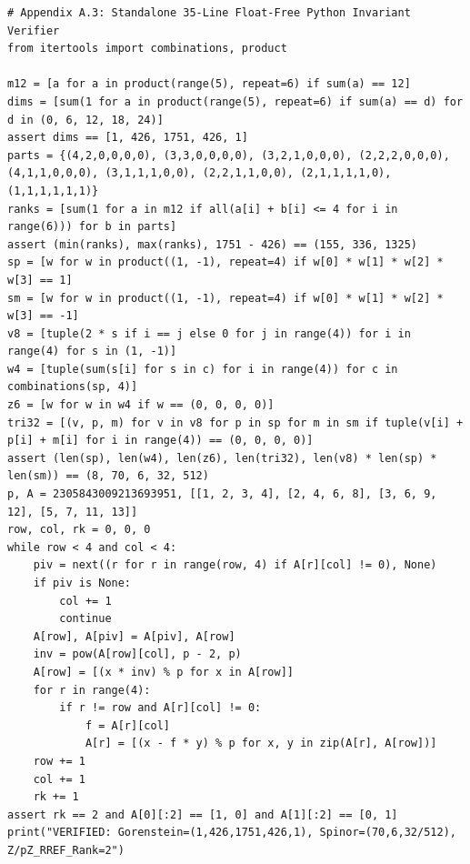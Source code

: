 \documentclass[11pt,a4paper]{article}
\theoremstyle{definition}
\theoremstyle{remark}
\begin{document}
\begin{lstlisting}[style=pycode]
# Appendix A.3: Standalone 35-Line Float-Free Python Invariant Verifier
from itertools import combinations, product

m12 = [a for a in product(range(5), repeat=6) if sum(a) == 12]
dims = [sum(1 for a in product(range(5), repeat=6) if sum(a) == d) for d in (0, 6, 12, 18, 24)]
assert dims == [1, 426, 1751, 426, 1]
parts = {(4,2,0,0,0,0), (3,3,0,0,0,0), (3,2,1,0,0,0), (2,2,2,0,0,0), (4,1,1,0,0,0), (3,1,1,1,0,0), (2,2,1,1,0,0), (2,1,1,1,1,0), (1,1,1,1,1,1)}
ranks = [sum(1 for a in m12 if all(a[i] + b[i] <= 4 for i in range(6))) for b in parts]
assert (min(ranks), max(ranks), 1751 - 426) == (155, 336, 1325)
sp = [w for w in product((1, -1), repeat=4) if w[0] * w[1] * w[2] * w[3] == 1]
sm = [w for w in product((1, -1), repeat=4) if w[0] * w[1] * w[2] * w[3] == -1]
v8 = [tuple(2 * s if i == j else 0 for j in range(4)) for i in range(4) for s in (1, -1)]
w4 = [tuple(sum(s[i] for s in c) for i in range(4)) for c in combinations(sp, 4)]
z6 = [w for w in w4 if w == (0, 0, 0, 0)]
tri32 = [(v, p, m) for v in v8 for p in sp for m in sm if tuple(v[i] + p[i] + m[i] for i in range(4)) == (0, 0, 0, 0)]
assert (len(sp), len(w4), len(z6), len(tri32), len(v8) * len(sp) * len(sm)) == (8, 70, 6, 32, 512)
p, A = 2305843009213693951, [[1, 2, 3, 4], [2, 4, 6, 8], [3, 6, 9, 12], [5, 7, 11, 13]]
row, col, rk = 0, 0, 0
while row < 4 and col < 4:
    piv = next((r for r in range(row, 4) if A[r][col] != 0), None)
    if piv is None:
        col += 1
        continue
    A[row], A[piv] = A[piv], A[row]
    inv = pow(A[row][col], p - 2, p)
    A[row] = [(x * inv) % p for x in A[row]]
    for r in range(4):
        if r != row and A[r][col] != 0:
            f = A[r][col]
            A[r] = [(x - f * y) % p for x, y in zip(A[r], A[row])]
    row += 1
    col += 1
    rk += 1
assert rk == 2 and A[0][:2] == [1, 0] and A[1][:2] == [0, 1]
print("VERIFIED: Gorenstein=(1,426,1751,426,1), Spinor=(70,6,32/512), Z/pZ_RREF_Rank=2")
\end{lstlisting}

{\small
\let\oldthebibliography\thebibliography
\renewcommand{\thebibliography}[1]{%
  \oldthebibliography{#1}%
  \setlength{\itemsep}{1pt}%
  \setlength{\parskip}{0pt}%
}


}
\end{document}
